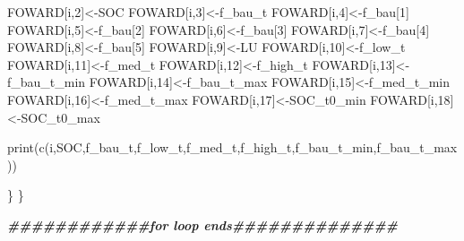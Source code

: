 \documentclass[
  10pt,
  b5paper,
]{book}
\newenvironment{Shaded}{\begin{snugshade}}{\end{snugshade}}
\newcommand{\DecValTok}[1]{\textcolor[rgb]{0.00,0.00,0.81}{#1}}
\newcommand{\DocumentationTok}[1]{\textcolor[rgb]{0.56,0.35,0.01}{\textbf{\textit{#1}}}}
\newcommand{\FunctionTok}[1]{\textcolor[rgb]{0.00,0.00,0.00}{#1}}
\newcommand{\NormalTok}[1]{#1}
\newcommand{\OtherTok}[1]{\textcolor[rgb]{0.56,0.35,0.01}{#1}}
\begin{document}
\begin{Shaded}
\begin{Highlighting}[]
\NormalTok{FOWARD[i,}\DecValTok{2}\NormalTok{]}\OtherTok{\textless{}{-}}\NormalTok{SOC}
\NormalTok{FOWARD[i,}\DecValTok{3}\NormalTok{]}\OtherTok{\textless{}{-}}\NormalTok{f\_bau\_t}
\NormalTok{FOWARD[i,}\DecValTok{4}\NormalTok{]}\OtherTok{\textless{}{-}}\NormalTok{f\_bau[}\DecValTok{1}\NormalTok{]}
\NormalTok{FOWARD[i,}\DecValTok{5}\NormalTok{]}\OtherTok{\textless{}{-}}\NormalTok{f\_bau[}\DecValTok{2}\NormalTok{]}
\NormalTok{FOWARD[i,}\DecValTok{6}\NormalTok{]}\OtherTok{\textless{}{-}}\NormalTok{f\_bau[}\DecValTok{3}\NormalTok{]}
\NormalTok{FOWARD[i,}\DecValTok{7}\NormalTok{]}\OtherTok{\textless{}{-}}\NormalTok{f\_bau[}\DecValTok{4}\NormalTok{]}
\NormalTok{FOWARD[i,}\DecValTok{8}\NormalTok{]}\OtherTok{\textless{}{-}}\NormalTok{f\_bau[}\DecValTok{5}\NormalTok{]}
\NormalTok{FOWARD[i,}\DecValTok{9}\NormalTok{]}\OtherTok{\textless{}{-}}\NormalTok{LU}
\NormalTok{FOWARD[i,}\DecValTok{10}\NormalTok{]}\OtherTok{\textless{}{-}}\NormalTok{f\_low\_t}
\NormalTok{FOWARD[i,}\DecValTok{11}\NormalTok{]}\OtherTok{\textless{}{-}}\NormalTok{f\_med\_t}
\NormalTok{FOWARD[i,}\DecValTok{12}\NormalTok{]}\OtherTok{\textless{}{-}}\NormalTok{f\_high\_t}
\NormalTok{FOWARD[i,}\DecValTok{13}\NormalTok{]}\OtherTok{\textless{}{-}}\NormalTok{f\_bau\_t\_min}
\NormalTok{FOWARD[i,}\DecValTok{14}\NormalTok{]}\OtherTok{\textless{}{-}}\NormalTok{f\_bau\_t\_max}
\NormalTok{FOWARD[i,}\DecValTok{15}\NormalTok{]}\OtherTok{\textless{}{-}}\NormalTok{f\_med\_t\_min}
\NormalTok{FOWARD[i,}\DecValTok{16}\NormalTok{]}\OtherTok{\textless{}{-}}\NormalTok{f\_med\_t\_max}
\NormalTok{FOWARD[i,}\DecValTok{17}\NormalTok{]}\OtherTok{\textless{}{-}}\NormalTok{SOC\_t0\_min}
\NormalTok{FOWARD[i,}\DecValTok{18}\NormalTok{]}\OtherTok{\textless{}{-}}\NormalTok{SOC\_t0\_max}



\FunctionTok{print}\NormalTok{(}\FunctionTok{c}\NormalTok{(i,SOC,f\_bau\_t,f\_low\_t,f\_med\_t,f\_high\_t,f\_bau\_t\_min,f\_bau\_t\_max))}

\NormalTok{\}}
\NormalTok{\}}

\DocumentationTok{\#\#\#\#\#\#\#\#\#\#\#\#for loop ends\#\#\#\#\#\#\#\#\#\#\#\#\#\#}



\end{Highlighting}
\end{Shaded}
\end{document}
